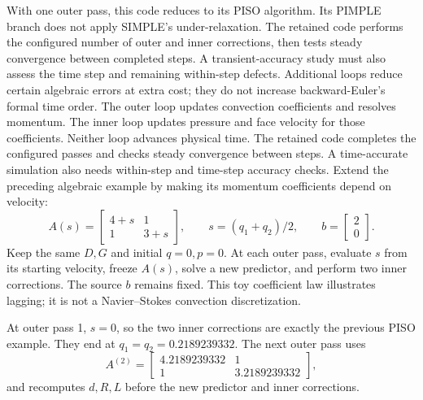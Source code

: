 With one outer pass, this code reduces to its PISO algorithm. Its PIMPLE branch does not apply SIMPLE's under-relaxation. The retained code performs the configured number of outer and inner corrections, then tests steady convergence between completed steps. A transient-accuracy study must also assess the time step and remaining within-step defects. Additional loops reduce certain algebraic errors at extra cost; they do not increase backward-Euler's formal time order.
\newpage
{}
The outer loop updates convection coefficients and resolves momentum. The inner loop updates pressure and face velocity for those coefficients. Neither loop advances physical time. The retained code completes the configured passes and checks steady convergence between steps. A time-accurate simulation also needs within-step and time-step accuracy checks.
\newpage
{}
Extend the preceding algebraic example by making its momentum coefficients depend on velocity:
\[
A(s)=\begin{bmatrix}4+s&1\\1&3+s\end{bmatrix},\qquad
s=(q_1+q_2)/2,\qquad b=\begin{bmatrix}2\\0\end{bmatrix}.
\]
Keep the same $D,G$ and initial $q=0,p=0$. At each outer pass, evaluate $s$ from its starting velocity, freeze $A(s)$, solve a new predictor, and perform two inner corrections. The source $b$ remains fixed. This toy coefficient law illustrates lagging; it is not a Navier--Stokes convection discretization.

At outer pass 1, $s=0$, so the two inner corrections are exactly the previous PISO example. They end at $q_1=q_2=0.2189239332$. The next outer pass uses
\[
A^{(2)}=\begin{bmatrix}4.2189239332&1\\1&3.2189239332\end{bmatrix},
\]
and recomputes $d,R,L$ before the new predictor and inner corrections.

